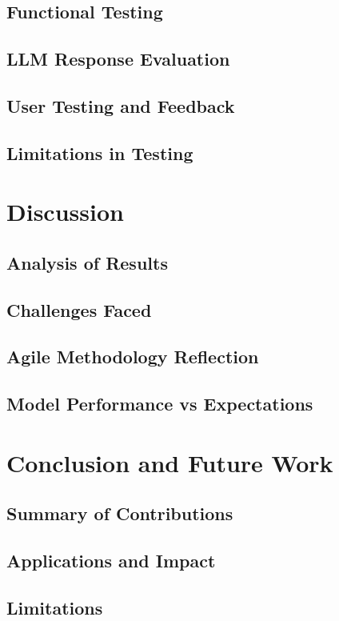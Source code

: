 \documentclass[12pt,a4paper]{report}
\begin{document}
\section{Functional Testing}
\section{LLM Response Evaluation}
\section{User Testing and Feedback}
\section{Limitations in Testing}

\chapter{Discussion}  %
\section{Analysis of Results}
\section{Challenges Faced}
\section{Agile Methodology Reflection}
\section{Model Performance vs Expectations}

\chapter{Conclusion and Future Work}  %
\section{Summary of Contributions}
\section{Applications and Impact}
\section{Limitations}
\end{document}
